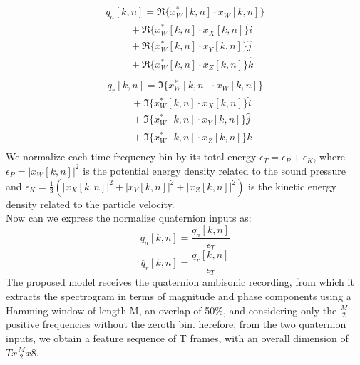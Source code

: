 \documentclass{article}
\begin{document}
    \begin{equation*}
            \begin{matrix}
                q_a[k,n]=\Re\{x_W^*[k,n] \cdot x_W[k,n]\} \\
                \hspace{1cm} + \Re\{x_W^*[k,n] \cdot x_X[k,n]\}\hat{i} \\
                \hspace{1cm} + \Re\{x_W^*[k,n] \cdot x_Y[k,n]\}\hat{j} \\
                \hspace{1cm} + \Re\{x_W^*[k,n]\cdot x_Z[k,n]\}\hat{k} \\
            \end{matrix}
    \end{equation*}
    \begin{equation*}
        \begin{matrix}
            q_r[k,n]=\Im\{x_W^*[k,n]\cdot x_W[k,n]\} \\
            \hspace{1cm} + \Im\{x_W^*[k,n]\cdot x_X[k,n]\}\hat{i} \\
            \hspace{1cm} + \Im\{x_W^*[k,n] \cdot x_Y[k,n]\}\hat{j} \\
            \hspace{1cm} + \Im\{x_W^*[k,n]\cdot x_Z[k,n]\}\hat{k} \\
        \end{matrix}
    \end{equation*}
    We normalize each time-frequency bin by its total energy $\epsilon_T=\epsilon_P+\epsilon_K$, where $\epsilon_P=|x_W[k, n]|^2$ 
    is the potential energy density related to the sound pressure and $\epsilon_K=\frac{1}{3}(|x_X[k, n]|^2+|x_Y[k, n]|^2+|x_Z[k, n]|^2)$ 
    is the kinetic energy density related to the particle velocity.
    \\ Now can we express the normalize quaternion inputs as:
    \begin{equation*}
        \overline{q}_a [k,n] = \frac{q_a[k,n]}{\epsilon_T} 
    \end{equation*}
    \begin{equation*}
        \overline{q}_r [k,n] = \frac{q_r[k,n]}{\epsilon_T} 
    \end{equation*}
    The proposed model receives the quaternion ambisonic recording, from which it extracts the spectrogram in terms of magnitude and phase
    components using a Hamming window of length M, an overlap of 50\%, and considering only the $\frac{M}{2}$ positive frequencies without the 
    zeroth bin. herefore, from the two quaternion inputs, we obtain a feature sequence of T frames, with an overall dimension of $Tx\frac{M}{2}x8$.
\end{document}

